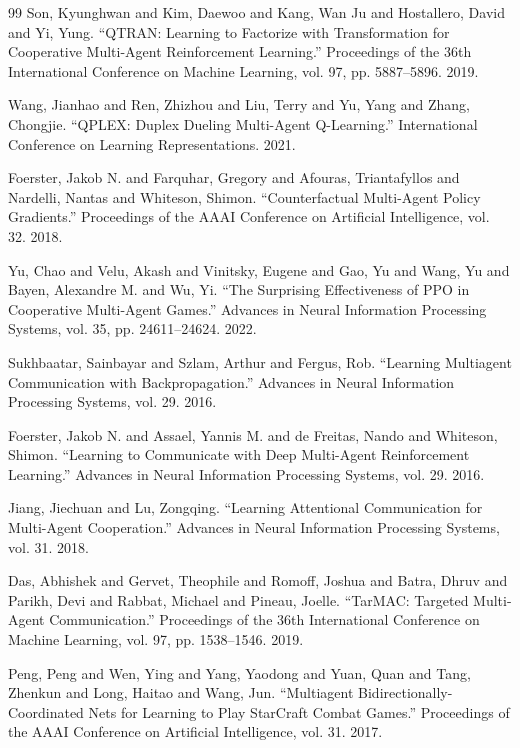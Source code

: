 \documentclass[preprint,12pt]{elsarticle}
\begin{document}
\begin{thebibliography}{99}
 Son, Kyunghwan and Kim, Daewoo and Kang, Wan Ju and Hostallero, David and Yi, Yung. ``QTRAN: Learning to Factorize with Transformation for Cooperative Multi-Agent Reinforcement Learning.'' Proceedings of the 36th International Conference on Machine Learning, vol. 97, pp. 5887--5896. 2019.

 Wang, Jianhao and Ren, Zhizhou and Liu, Terry and Yu, Yang and Zhang, Chongjie. ``QPLEX: Duplex Dueling Multi-Agent Q-Learning.'' International Conference on Learning Representations. 2021.

 Foerster, Jakob N. and Farquhar, Gregory and Afouras, Triantafyllos and Nardelli, Nantas and Whiteson, Shimon. ``Counterfactual Multi-Agent Policy Gradients.'' Proceedings of the AAAI Conference on Artificial Intelligence, vol. 32. 2018.

 Yu, Chao and Velu, Akash and Vinitsky, Eugene and Gao, Yu and Wang, Yu and Bayen, Alexandre M. and Wu, Yi. ``The Surprising Effectiveness of PPO in Cooperative Multi-Agent Games.'' Advances in Neural Information Processing Systems, vol. 35, pp. 24611--24624. 2022.

 Sukhbaatar, Sainbayar and Szlam, Arthur and Fergus, Rob. ``Learning Multiagent Communication with Backpropagation.'' Advances in Neural Information Processing Systems, vol. 29. 2016.

 Foerster, Jakob N. and Assael, Yannis M. and de Freitas, Nando and Whiteson, Shimon. ``Learning to Communicate with Deep Multi-Agent Reinforcement Learning.'' Advances in Neural Information Processing Systems, vol. 29. 2016.

 Jiang, Jiechuan and Lu, Zongqing. ``Learning Attentional Communication for Multi-Agent Cooperation.'' Advances in Neural Information Processing Systems, vol. 31. 2018.

 Das, Abhishek and Gervet, Theophile and Romoff, Joshua and Batra, Dhruv and Parikh, Devi and Rabbat, Michael and Pineau, Joelle. ``TarMAC: Targeted Multi-Agent Communication.'' Proceedings of the 36th International Conference on Machine Learning, vol. 97, pp. 1538--1546. 2019.

 Peng, Peng and Wen, Ying and Yang, Yaodong and Yuan, Quan and Tang, Zhenkun and Long, Haitao and Wang, Jun. ``Multiagent Bidirectionally-Coordinated Nets for Learning to Play StarCraft Combat Games.'' Proceedings of the AAAI Conference on Artificial Intelligence, vol. 31. 2017.


\end{thebibliography}
\end{document}
